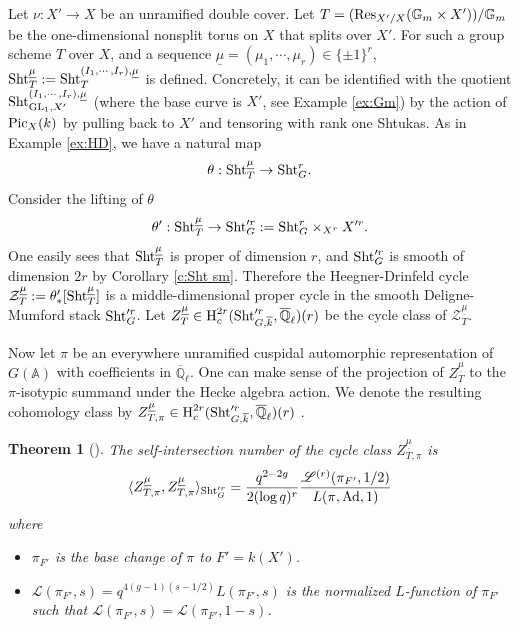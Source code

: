 \documentclass[11pt]{amsart}
\numberwithin{equation}{section}
\theoremstyle{plain}
\newtheorem{theorem}[subsubsection]{Theorem}
\theoremstyle{definition}
\def\AA{\mathbb{A}}
\def\GG{\mathbb{G}}
\def\QQ{\mathbb{Q}}
\newcommand\cZ{\mathcal{Z}}
\newcommand{\Pic}{\textup{Pic}}
\newcommand{\Res}{\textup{Res}}
\newcommand\Sht{\textup{Sht}}
\newcommand\GL{\textup{GL}}
\newcommand{\Gm}{\GG_m}
\newcommand{\Ad}{\textup{Ad}}
\newcommand{\Qlbar}{\overline{\QQ}_\ell}
\renewcommand{\j}[1]{\langle{#1}\rangle}
\newcommand\un{\underline}
\newcommand{\cohoc}[2]{\textup{H}_{c}^{#1}({#2})}     %
\renewcommand{\th}{\theta}
\newcommand{\kbar}{\overline{k}}
\newcommand\sL{\mathscr{L}}
\begin{document}
Let $\nu:X'\to X$ be an unramified double cover. Let $T=(\Res_{X'/X}(\Gm\times X'))/\Gm$ be the one-dimensional nonsplit torus on $X$ that splits over $X'$. For such a group scheme $T$ over $X$, and a sequence $\un\mu=(\mu_{1},\cdots, \mu_{r})\in\{\pm1\}^{r}$,  $\Sht_{T}^{\un\mu}:=\Sht_{T}^{(I_{1},\cdots, I_{r}), \un\mu}$ is defined. Concretely, it can be identified with the quotient $\Sht^{(I_{1},\cdots, I_{r}), \un\mu}_{\GL_{1}, X'}$ (where the base curve is $X'$, see Example \ref{ex:Gm}) by the action of $\Pic_{X}(k)$ by pulling back to $X'$ and tensoring with rank one Shtukas. As in Example \ref{ex:HD}, we have a natural map
\begin{equation*}
\th: \Sht^{\un\mu}_{T}\to \Sht^{r}_{G}.
\end{equation*}
Consider the lifting of $\th$
\begin{equation*}
\th': \Sht^{\un\mu}_{T} \to \Sht'^{r}_{G}:=\Sht^{r}_{G}\times_{X^{r}}X'^{r}.
\end{equation*} 
One easily sees that $\Sht^{\un\mu}_{T}$ is proper of dimension $r$, and $\Sht'^{r}_{G}$ is smooth of dimension $2r$ by Corollary \ref{c:Sht sm}. Therefore the Heegner-Drinfeld cycle $\cZ^{\un\mu}_{T}:=\th'_{*}[\Sht^{\un\mu}_{T}]$ is a middle-dimensional proper cycle in the smooth Deligne-Mumford stack $\Sht'^{r}_{G}$. Let $Z^{\un\mu}_{T}\in \cohoc{2r}{\Sht'^{r}_{G,\kbar},\Qlbar}(r)$ be the cycle class of $\cZ^{\un\mu}_{T}$.

Now let $\pi$ be an everywhere unramified cuspidal automorphic representation of $G(\AA)$ with coefficients in $\Qlbar$.  One can make sense of the projection of $Z^{\un\mu}_{T}$ to the $\pi$-isotypic summand under the Hecke algebra action. We denote the resulting cohomology class by $Z^{\un\mu}_{T,\pi}\in \cohoc{2r}{\Sht'^{r}_{G,\kbar},\Qlbar}(r)$ . 


\begin{theorem}[\cite{YZ1}]\label{th:YZ1} The self-intersection number of the cycle class $Z^{\un\mu}_{T,\pi}$ is
\begin{equation*}
\j{Z^{\un\mu}_{T,\pi}, Z^{\un\mu}_{T,\pi}}_{\Sht'^{r}_{G}}=\frac{q^{2-2g}}{2(\log q)^{r}}\frac{\sL^{(r)}(\pi_{F'}, 1/2)}{L(\pi,\Ad,1)}
\end{equation*}
where
\begin{itemize}
\item $\pi_{F'}$ is the base change of $\pi$ to $F'=k(X')$. 
\item $\sL(\pi_{F'},s)=q^{4(g-1)(s-1/2)}L(\pi_{F'},s)$ is the normalized $L$-function of $\pi_{F'}$ such that $\sL(\pi_{F'},s)=\sL(\pi_{F'},1-s)$.
\end{itemize}
\end{theorem}
\end{document}
